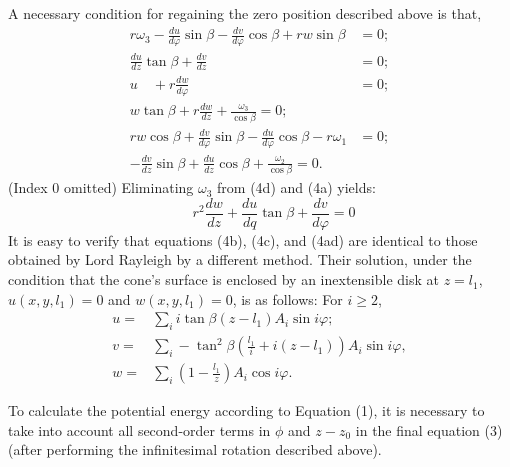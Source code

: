 \documentclass{amsart}
\begin{document}
A necessary condition for regaining the zero position described above is that,
\begin{subequations}\label{eq4abcdef}
\begin{align}
r \omega_3-\frac{d u}{d \varphi} \sin \beta-\frac{d v}{d \varphi} \cos \beta+r w \sin \beta & =0; \\
\frac{d u}{d z} \tan \beta+\frac{d v}{d z} & =0; \\
u \quad+r \frac{d w}{d \varphi} & =0; \\
w \tan \beta + r \frac{d w}{d z}+\frac{\omega_3}{\cos \beta}=0; \\
r w \cos \beta+\frac{d v}{d \varphi} \sin \beta-\frac{d u}{d \varphi} \cos \beta-r \omega_1 & =0; \\
-\frac{d v}{d z} \sin \beta+\frac{d u}{d z} \cos \beta+\frac{\omega_2}{\cos \beta}=0 . &
\end{align}
\end{subequations}
(Index 0 omitted) Eliminating \(\omega_3\)  from (4d) and (4a) yields:
\[
\tag{4ad} \qquad
r^2 \frac{d w}{d z}+\frac{d u}{d q} \tan \beta+\frac{d v}{d \varphi}=0
\]
It is easy to verify that equations (4b), (4c), and (4ad) are identical to
those obtained by Lord Rayleigh \autocite[p 399 Eq 14]{Rayleigh1887}
by a different method.
Their solution, under the condition that the cone's surface is enclosed by an
inextensible disk at \(z = l_1\), \(u(x,y, l_1)=0\) and \(w(x,y,l_1)=0\),
is as follows: For \( i \geq 2 \),
\begin{equation}\label{eq5p732}
\begin{aligned}
u=&\sum_i i \tan \beta\left(z-l_1\right) A_i \sin i \varphi; \\
v=&\sum_i-\tan^2 \beta\left( \frac{l_1}{i}+i\left(z-l_1\right)\right) A_i \sin i \varphi, \\
w=&\sum_i\left(1-\frac{l_1}{z}\right) A_i \cos i \varphi .
\end{aligned}
\end{equation}

To calculate the potential energy according to Equation (1), it is necessary to take
into account all second-order terms in $\phi$ and $z - z_0$ in the final equation
(3) (after performing the infinitesimal rotation described above).
\end{document}

